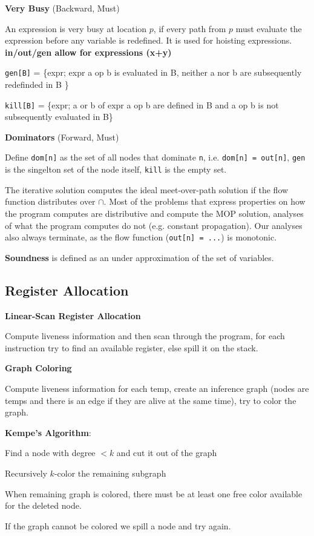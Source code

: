 \textbf{Very Busy} (Backward, Must)\medskip

An expression is very busy at location $p$, if every path from $p$ must evaluate the expression before any variable is redefined.
It is used for hoisting expressions. \textbf{in/out/gen allow for expressions (x+y)} \medskip

\texttt{gen[B]} = \{expr; expr a op b is evaluated in B, neither a nor b are subsequently redefinded in B \}\smallskip

\texttt{kill[B]} = \{expr; a or b of expr a op b are defined in B and a op b is not subsequently evaluated in B\} \medskip

\textbf{Dominators} (Forward, Must)\medskip

Define \texttt{dom[n]} as the set of all nodes that dominate \texttt{n}, i.e. \texttt{dom[n] = out[n]}, \texttt{gen} is the singelton set of the node itself, \texttt{kill} is the empty set.\medskip

The iterative solution computes the ideal meet-over-path solution if the flow function distributes over $\cap$. Most of the problems that express properties on how the program computes are distributive and compute the MOP solution, analyses of what the program computes do not (e.g. constant propagation). Our analyses also always terminate, as the flow function (\texttt{out[n] = ...}) is monotonic.\medskip

\textbf{Soundness} is defined as an under approximation of the set of variables.


\subsection*{Register Allocation}

\textbf{Linear-Scan Register Allocation}\medskip

Compute liveness information and then scan through the program, for each instruction try to find an available register, else spill it on the stack.\medskip

\textbf{Graph Coloring}\medskip

Compute liveness information for each temp, create an inference graph (nodes are temps and there is an edge if they are alive at the same time), try to color the graph.\medskip

\textbf{Kempe's Algorithm}:
\begin{compactitem}
	\item Find a node with degree $< k$ and cut it out of the graph
	\item Recursively $k$-color the remaining subgraph
	\item When remaining graph is colored, there must be at least one free color available for the deleted node.
	\item If the graph cannot be colored we spill a node and try again.
\end{compactitem}\medskip


